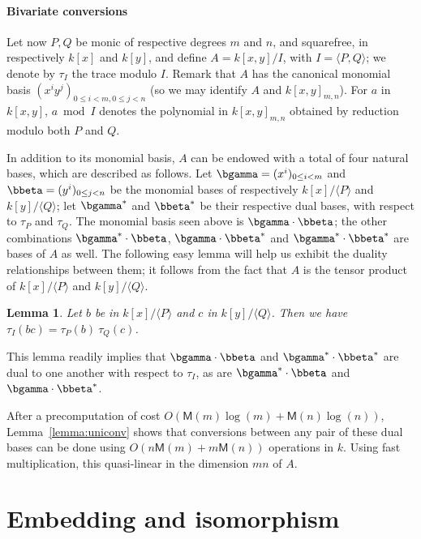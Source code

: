 \documentclass{sig-alternate}
\def\M {\ensuremath{\mathsf{M}}}
\newcommand{\ang}[1]{\langle#1\rangle}
\newtheorem{Lemma}{Lemma}
\begin{document}
\paragraph*{{\bf \rm Bivariate conversions}} Let now $P,Q$ be monic of respective 
degrees $m$ and $n$, and squarefree, in respectively $k[x]$ and
$k[y]$, and define $A=k[x,y]/I$, with $I=\ang{P,Q}$; we denote by
$\tau_I$ the trace modulo $I$. Remark that $A$ has the canonical
monomial basis $(x^i y^j)_{0 \le i <m, 0 \le j < n}$ (so we may
identify $A$ and $k[x,y]_{m,n}$). For $a$ in $k[x,y]$, $a \bmod I$
denotes the polynomial in $k[x,y]_{m,n}$ obtained by reduction modulo
both $P$ and $Q$.

In addition to its monomial basis, $A$ can be endowed with a total of
four natural bases, which are described as follows. Let
$\bgamma=(x^i)_{0 \le i < m}$ and $\bbeta=(y^i)_{0 \le j < n}$ be the
monomial bases of respectively $k[x]/\ang{P}$ and $k[y]/\ang{Q}$; let
$\bgamma^\ast$ and $\bbeta^\ast$ be their respective dual bases, with
respect to $\tau_P$ and $\tau_Q$. The monomial basis seen above is
$\bgamma \cdot \bbeta$; the other combinations $\bgamma^\ast \cdot
\bbeta$, $\bgamma \cdot \bbeta^\ast$ and $\bgamma^\ast \cdot
\bbeta^\ast$ are bases of $A$ as well. The following easy lemma will
help us exhibit the duality relationships between them; it follows
from the fact that $A$ is the tensor product of $k[x]/\ang{P}$ and
$k[y]/\ang{Q}$.

\begin{Lemma}
  \label{lemma:traces:PQR1}
  Let $b$ be in $k[x]/\ang{P}$ and $c$ in $k[y]/\ang{Q}$. Then we have
  $\tau_I(bc) = \tau_P(b) \ \tau_Q(c)$.
\end{Lemma}

This lemma readily implies that $\bgamma \cdot \bbeta$ and
$\bgamma^\ast \cdot \bbeta^\ast$ are dual to one another with respect
to $\tau_I$, as are $\bgamma^\ast \cdot \bbeta$ and $\bgamma \cdot
\bbeta^\ast$. 

After a precomputation of cost $O(\M(m)\log(m) + \M(n)\log(n))$,
Lemma~\ref{lemma:uniconv} shows that conversions between any pair of
these dual bases can be done using $O(n\M(m)+m\M(n))$ operations in
$k$. Using fast multiplication, this quasi-linear in the dimension
$mn$ of $A$.


\section{Embedding and isomorphism} 
\end{document}
